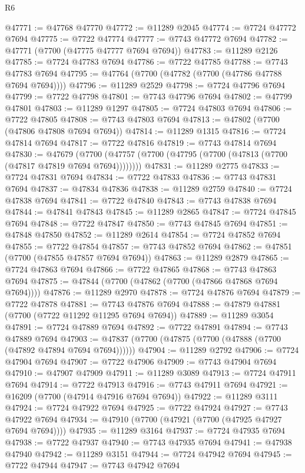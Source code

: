 \begin{lexlean}{R6}
\begin{coremodule}
@47771 := @47768 @47770
@47772 := @11289 @2045
@47774 := @7724 @47772 @7694
@47775 := @7722 @47774
@47777 := @7743 @47772 @7694
@47782 := @47771 (@7700 (@47775 @47777 @7694 @7694))
@47783 := @11289 @2126
@47785 := @7724 @47783 @7694
@47786 := @7722 @47785
@47788 := @7743 @47783 @7694
@47795 := @47764 (@7700 (@47782 (@7700 (@47786 @47788 @7694 @7694))))
@47796 := @11289 @2529
@47798 := @7724 @47796 @7694
@47799 := @7722 @47798
@47801 := @7743 @47796 @7694
@47802 := @47799 @47801
@47803 := @11289 @1297
@47805 := @7724 @47803 @7694
@47806 := @7722 @47805
@47808 := @7743 @47803 @7694
@47813 := @47802 (@7700 (@47806 @47808 @7694 @7694))
@47814 := @11289 @1315
@47816 := @7724 @47814 @7694
@47817 := @7722 @47816
@47819 := @7743 @47814 @7694
@47830 := @47679
    (@7700 (@47757 (@7700 (@47795 (@7700 (@47813 (@7700 (@47817 @47819 @7694 @7694))))))))
@47831 := @11289 @2775
@47833 := @7724 @47831 @7694
@47834 := @7722 @47833
@47836 := @7743 @47831 @7694
@47837 := @47834 @47836
@47838 := @11289 @2759
@47840 := @7724 @47838 @7694
@47841 := @7722 @47840
@47843 := @7743 @47838 @7694
@47844 := @47841 @47843
@47845 := @11289 @2865
@47847 := @7724 @47845 @7694
@47848 := @7722 @47847
@47850 := @7743 @47845 @7694
@47851 := @47848 @47850
@47852 := @11289 @2614
@47854 := @7724 @47852 @7694
@47855 := @7722 @47854
@47857 := @7743 @47852 @7694
@47862 := @47851 (@7700 (@47855 @47857 @7694 @7694))
@47863 := @11289 @2879
@47865 := @7724 @47863 @7694
@47866 := @7722 @47865
@47868 := @7743 @47863 @7694
@47875 := @47844 (@7700 (@47862 (@7700 (@47866 @47868 @7694 @7694))))
@47876 := @11289 @2970
@47878 := @7724 @47876 @7694
@47879 := @7722 @47878
@47881 := @7743 @47876 @7694
@47888 := @47879 @47881 (@7700 (@7722 @11292 @11295 @7694 @7694))
@47889 := @11289 @3054
@47891 := @7724 @47889 @7694
@47892 := @7722 @47891
@47894 := @7743 @47889 @7694
@47903 := @47837 (@7700 (@47875 (@7700 (@47888 (@7700 (@47892 @47894 @7694 @7694))))))
@47904 := @11289 @2792
@47906 := @7724 @47904 @7694
@47907 := @7722 @47906
@47909 := @7743 @47904 @7694
@47910 := @47907 @47909
@47911 := @11289 @3089
@47913 := @7724 @47911 @7694
@47914 := @7722 @47913
@47916 := @7743 @47911 @7694
@47921 := @16209 (@7700 (@47914 @47916 @7694 @7694))
@47922 := @11289 @3111
@47924 := @7724 @47922 @7694
@47925 := @7722 @47924
@47927 := @7743 @47922 @7694
@47934 := @47910 (@7700 (@47921 (@7700 (@47925 @47927 @7694 @7694))))
@47935 := @11289 @3164
@47937 := @7724 @47935 @7694
@47938 := @7722 @47937
@47940 := @7743 @47935 @7694
@47941 := @47938 @47940
@47942 := @11289 @3151
@47944 := @7724 @47942 @7694
@47945 := @7722 @47944
@47947 := @7743 @47942 @7694

\end{coremodule}
\end{lexlean}
